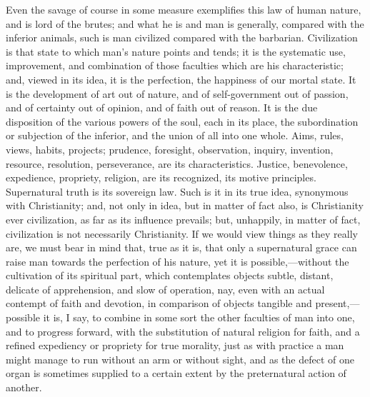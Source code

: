 Even the savage of course in
some measure exemplifies this law of human nature, and is lord of the
brutes; and what he is and man is generally, compared with the
inferior animals, such is man civilized compared with the barbarian.
Civilization is that state to which man's nature points and
tends; it is the systematic use, improvement, and combination of those
faculties which are his characteristic; and, viewed in its idea, it is
the perfection, the happiness of our mortal state. It is the
development of art out of nature, and of self-government out of
passion, and of certainty out of opinion, and of faith out of reason.
It is the due disposition of the various powers of the soul, each in
its place, the subordination or subjection of the inferior, and the
union of all into one whole. Aims, rules, views, habits, projects;
prudence, foresight, observation, inquiry, invention, resource,
resolution, perseverance, are its characteristics. Justice,
benevolence, expedience, propriety, religion, are its recognized, its
motive principles. Supernatural truth is its sovereign law. Such is it
in its true idea, synonymous with Christianity; and, not only in idea,
but in matter of fact also, is Christianity ever civilization, as far
as its influence prevails; but, unhappily, in matter of fact,
civilization is not necessarily Christianity. If we would view things
as they really are, we must bear in mind that, true as it is, that
only a supernatural grace can raise man towards the perfection of his
nature, yet it is possible,—without the cultivation of its spiritual
part, which contemplates objects subtle, distant, delicate of
apprehension, and slow of operation, nay, even with an actual contempt
of faith and devotion, in comparison of objects tangible and
present,—possible it is, I say, to combine in some sort the other
faculties of man into one, and to progress forward, with the
substitution of natural religion for faith, and a refined expediency
or propriety for true morality, just as with practice a man might
manage to run without an arm or without sight, and as the defect of
one organ is sometimes supplied to a certain extent by the
preternatural action of another.

